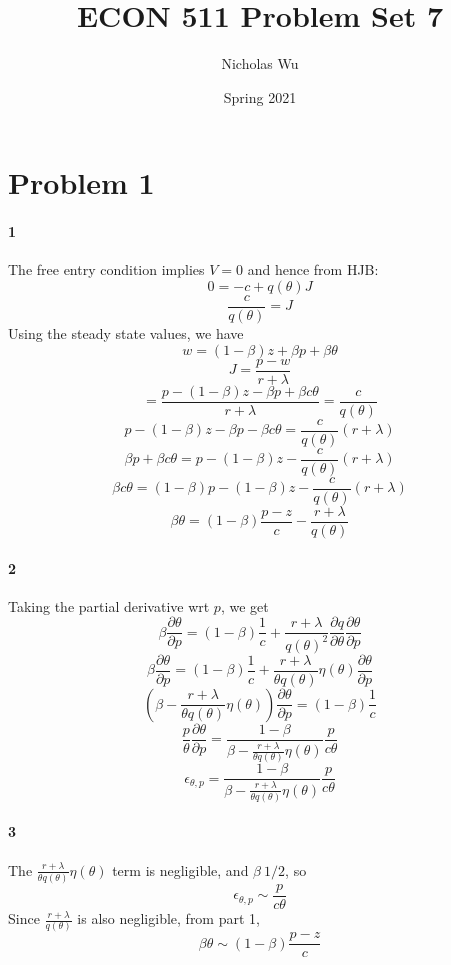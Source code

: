 \documentclass[10pt,letter]{article}
\newcommand{\problem}[1]{\section*{Problem #1}}
\newcommand{\problempart}[1]{\paragraph{#1}}
\begin{document}


\title{ECON 511 Problem Set 7}

\author{Nicholas Wu}

\date{Spring 2021}

\maketitle

\problem{1}
\problempart{1}
The free entry condition implies $V = 0$ and hence from HJB:
\[ 0 = -c + q(\theta) J \]
\[ \frac{c}{q(\theta)} = J\]
Using the steady state values, we have
\[ w = (1-\beta)z + \beta p + \beta \theta  \]
\[ J = \frac{p-w}{r + \lambda} \]
\[ = \frac{p-(1-\beta)z - \beta p + \beta c\theta}{r + \lambda} = \frac{c}{q(\theta)} \]
\[ p-(1-\beta)z - \beta p - \beta c\theta = \frac{c}{q(\theta)}(r + \lambda) \]
\[ \beta p  + \beta c\theta = p-(1-\beta)z - \frac{c}{q(\theta)}(r + \lambda)  \]
\[  \beta c\theta = (1-\beta)p-(1-\beta)z - \frac{c}{q(\theta)}(r + \lambda)  \]
\[  \beta \theta = (1-\beta)\frac{p-z}{c} - \frac{r + \lambda}{q(\theta)}  \]
\problempart{2}
Taking the partial derivative wrt $p$, we get
\[ \beta \frac{\partial \theta}{\partial p} = (1-\beta)\frac{1}{c} + \frac{r+\lambda}{q(\theta)^2}\frac{\partial q}{\partial \theta} \frac{\partial \theta}{\partial p} \]
\[ \beta \frac{\partial \theta}{\partial p} = (1-\beta)\frac{1}{c} + \frac{r+\lambda}{\theta q(\theta) }\eta(\theta) \frac{\partial \theta}{\partial p} \]
\[ \left( \beta - \frac{r+\lambda}{\theta q(\theta) }\eta(\theta)  \right) \frac{\partial \theta}{\partial p} = (1-\beta)\frac{1}{c} \]
\[ \frac{p}{\theta} \frac{\partial \theta}{\partial p} = \frac{1-\beta}{\beta - \frac{r+\lambda}{\theta q(\theta) }\eta(\theta)}\frac{p}{c \theta} \]
\[ \epsilon_{\theta,p} = \frac{1-\beta}{\beta - \frac{r+\lambda}{\theta q(\theta) }\eta(\theta)}\frac{p}{c \theta} \]
\problempart{3}
The $\frac{r+\lambda}{\theta q(\theta) }\eta(\theta)$ term is negligible, and $\beta ~ 1/2$, so
\[ \epsilon_{\theta,p} \sim \frac{p}{c \theta} \]
Since $\frac{r+\lambda}{ q(\theta) }$ is also negligible, from part 1,
\[ \beta \theta \sim (1-\beta)\frac{p-z}{c} \]
\end{document}
